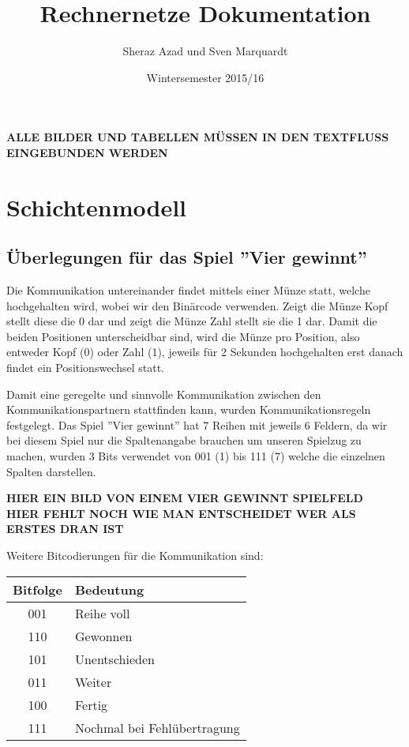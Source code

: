 \documentclass{scrartcl}
\begin{document}
  \title{Rechnernetze Dokumentation}
  \author{Sheraz Azad und Sven Marquardt}
  \date{Wintersemester 2015/16}
  \maketitle
  
  \tableofcontents
  \textbf{ALLE BILDER UND TABELLEN MÜSSEN IN DEN TEXTFLUSS EINGEBUNDEN WERDEN}
  
  \newpage
\section[Versuch 1 Schichtenmodell]{Schichtenmodell}  
  \subsection[Aufgabe 2 Überlegungen für das Spiel Vier gewinnt]{Überlegungen für das Spiel ''Vier gewinnt''}
  
  Die Kommunikation untereinander findet mittels einer Münze statt, welche hochgehalten wird, wobei wir den Binärcode verwenden. Zeigt die Münze Kopf stellt diese die 0 dar und zeigt die Münze Zahl stellt sie die 1 dar. Damit die beiden Positionen unterscheidbar sind, wird die Münze pro Position, also entweder Kopf (0) oder Zahl (1), jeweils für 2 Sekunden hochgehalten erst danach findet ein Positionswechsel statt.
    
  Damit eine geregelte und sinnvolle Kommunikation zwischen den Kommunikationspartnern stattfinden kann, wurden Kommunikationsregeln festgelegt. Das Spiel ''Vier gewinnt'' hat 7 Reihen mit jeweils 6 Feldern, da wir bei diesem Spiel nur die Spaltenangabe brauchen um unseren Spielzug zu machen, wurden 3 Bits verwendet von 001 (1) bis 111 (7) welche die einzelnen Spalten darstellen.
  
  \textbf{HIER EIN BILD VON EINEM VIER GEWINNT SPIELFELD}\\
  \textbf{HIER FEHLT NOCH WIE MAN ENTSCHEIDET WER ALS ERSTES DRAN IST}
  
  Weitere Bitcodierungen für die Kommunikation sind:

    \begin{tabular}{|c|l}
      \textbf{Bitfolge} & \textbf{Bedeutung} \\ \hline
        001 & Reihe voll \\
      110 & Gewonnen \\
      101 & Unentschieden \\
      011 & Weiter \\
      100 & Fertig \\
      111 & Nochmal bei Fehlübertragung 
    \end{tabular}
    
\end{document}
